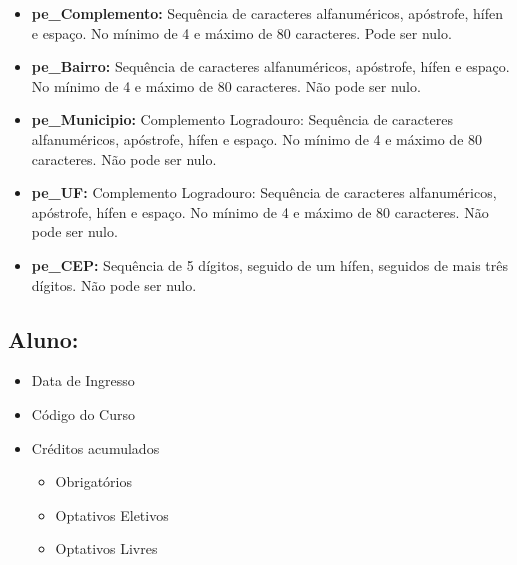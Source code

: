 \documentclass{report}
\begin{document}
\begin{itemize}
\begin{itemize}
  	\item \textbf{pe\_Complemento:} Sequência de caracteres alfanuméricos, apóstrofe, hífen e espaço. No mínimo de 4 e máximo de 80 caracteres. Pode ser nulo.
  	\item \textbf{pe\_Bairro:} Sequência de caracteres alfanuméricos, apóstrofe, hífen e espaço. No mínimo de 4 e máximo de 80 caracteres. Não pode ser nulo.
  	\item \textbf{pe\_Municipio:} Complemento Logradouro: Sequência de caracteres alfanuméricos, apóstrofe, hífen e espaço. No mínimo de 4 e máximo de 80 caracteres. Não pode ser nulo.
  	\item \textbf{pe\_UF:} Complemento Logradouro: Sequência de caracteres alfanuméricos, apóstrofe, hífen e espaço. No mínimo de 4 e máximo de 80 caracteres. Não pode ser nulo.
  	\item \textbf{pe\_CEP:} Sequência de 5 dígitos, seguido de um hífen, seguidos de mais três dígitos. Não pode ser nulo.
  	\end{itemize}
\end{itemize}

\subsection{Aluno:}
\begin{itemize}
  \item Data de Ingresso
  \item Código do Curso
  \item Créditos acumulados
  \begin{itemize}
  	\item Obrigatórios
  	\item Optativos Eletivos
  	\item Optativos Livres
  \end{itemize}

\end{itemize}
\end{document}
